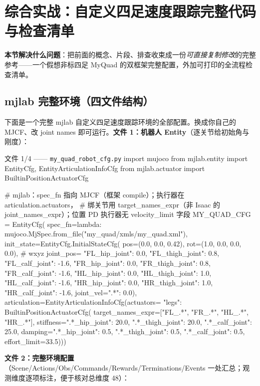\section{综合实战：自定义四足速度跟踪完整代码与检查清单}
\label{sec:rlmc-diy-fullcode}

\textbf{本节解决什么问题}：把前面的概念、片段、排查收束成一份\emph{可直接复制修改}的完整参考——一个假想非标四足 MyQuad 的双框架完整配置，外加可打印的全流程检查清单。

\subsection{mjlab 完整环境（四文件结构）}
\label{sec:rlmc-diy-fullcode-mjlab}

下面是一个完整 mjlab 自定义四足速度跟踪环境的全部配置。换成你自己的 MJCF、改 joint names 即可运行。\textbf{文件 1：机器人 Entity}（逐关节给初始角与刚度）：

\begin{codebox}[Python]{文件 1/4 —— \texttt{my\_quad\_robot\_cfg.py}}
import mujoco
from mjlab.entity import EntityCfg, EntityArticulationInfoCfg
from mjlab.actuator import BuiltinPositionActuatorCfg

# mjlab：spec_fn 指向 MJCF（框架 compile）；执行器在 articulation.actuators，
# 绑关节用 target_names_expr（非 Isaac 的 joint_names_expr）；位置 PD 执行器无 velocity_limit 字段
MY_QUAD_CFG = EntityCfg(
    spec_fn=lambda: mujoco.MjSpec.from_file("my_quad/xmls/my_quad.xml"),
    init_state=EntityCfg.InitialStateCfg(
        pos=(0.0, 0.0, 0.42), rot=(1.0, 0.0, 0.0, 0.0),     # wxyz
        joint_pos={
            "FL_hip_joint": 0.0, "FL_thigh_joint": 0.8, "FL_calf_joint": -1.6,
            "FR_hip_joint": 0.0, "FR_thigh_joint": 0.8, "FR_calf_joint": -1.6,
            "HL_hip_joint": 0.0, "HL_thigh_joint": 1.0, "HL_calf_joint": -1.6,
            "HR_hip_joint": 0.0, "HR_thigh_joint": 1.0, "HR_calf_joint": -1.6},
        joint_vel={".*": 0.0}),
    articulation=EntityArticulationInfoCfg(actuators={
        "legs": BuiltinPositionActuatorCfg(
            target_names_expr=["FL_.*", "FR_.*", "HL_.*", "HR_.*"],
            stiffness={".*_hip_joint": 20.0, ".*_thigh_joint": 20.0, ".*_calf_joint": 25.0},
            damping={".*_hip_joint": 0.5, ".*_thigh_joint": 0.5, ".*_calf_joint": 0.5},
            effort_limit=33.5)}))
\end{codebox}

\textbf{文件 2：完整环境配置}（Scene/Actions/Obs/Commands/Rewards/Terminations/Events 一处汇总；观测维度逐项标注，便于核对总维度 48）：

